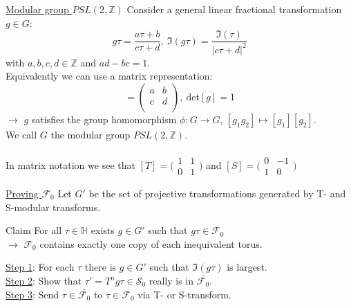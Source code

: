 \documentclass[11pt,aspectratio=169]{beamer}
\begin{document}
\begin{frame}{\underline{Modular group $PSL(2, \mathbb{Z})$}}
	Consider a general linear fractional transformation $g \in G$:
	\begin{equation}
		g\tau = \frac{a\tau + b}{c\tau + d},~\Im(g\tau) = \frac{\Im(\tau)}{|c\tau + d|^2}
	\end{equation}
	with $a, b, c, d \in \mathbb{Z}$ and $ad- bc = 1$.
	\\
	Equivalently we can use a matrix representation:
	\begin{equation}
		[g] = \begin{pmatrix}
			a & b \\
			c & d \\
		\end{pmatrix},~\textrm{det}[g] = 1
	\end{equation}
	$\rightarrow$ $g$ satisfies the group homomorphism $\phi : G \rightarrow G$, $[g_1 g_2] \mapsto [g_1][g_2]$.
	\\
	We call $G$ the modular group $PSL(2, \mathbb{Z})$.
	\\~\\
	In matrix notation we see that $[T] = \big(\begin{smallmatrix}
		1 & 1\\
		0 & 1
	  \end{smallmatrix}\big)$ and $[S] = \big(\begin{smallmatrix}
		0 & -1\\
		1 & 0
	  \end{smallmatrix}\big)$ 
\end{frame}

\begin{frame}{\underline{Proving $\mathcal{F}_0$}}
	Let $G'$ be the set of projective transformations generated by T- and S-modular transforms.
	\\
	\begin{block}{Claim}
		For all $\tau \in \mathbb{H}$ exists $g \in G'$ such that $g\tau \in \mathcal{F}_0$
		\\
		$\rightarrow$ $\mathcal{F}_0$ contains exactly one copy of each inequivalent torus.
	\end{block}
	\underline{Step 1}: For each $\tau$ there is $g \in G'$ such that $\Im(g\tau)$ is largest.
	\\
	\underline{Step 2}: Show that $\tau' = T^{n}g\tau \in \mathcal{S}_0$ really is in $\bar{\mathcal{F}_0}$.
	\\
	\underline{Step 3}: Send $\tau \in \bar{\mathcal{F}_0}$ to $\tau \in \mathcal{F}_0$ via T- or S-transform.
\end{frame}
\end{document}
